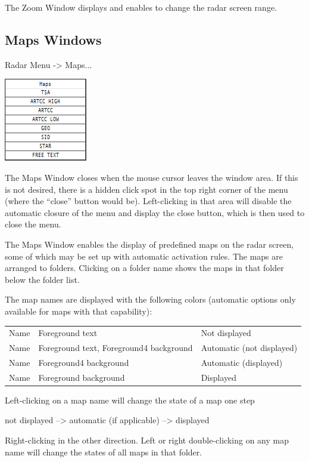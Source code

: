 \documentclass[11pt,a4paper]{memoir}
\begin{document}
The Zoom Window displays and enables to change the radar screen range.

\subsection{Maps Windows}
\label{win:mapsw}

Radar Menu -> Maps...

\includegraphics{img/mapsmenu.png}

The Maps Window closes when the mouse cursor leaves the window area. If this is not desired, there is a
hidden click spot in the top right corner of the menu (where the “close” button would be). Left-clicking in
that area will disable the automatic closure of the menu and display the close button, which is then used to
close the menu.

The Maps Window enables the display of predefined maps on the radar screen, some of which may be set
up with automatic activation rules. The maps are arranged to folders. Clicking on a folder name shows the
maps in that folder below the folder list.

The map names are displayed with the following colors (automatic options only available for maps with
that capability):

\begin{tabular}{l l l}
    Name & Foreground text                          & Not displayed\\
    Name & Foreground text, Foreground4 background  & Automatic (not displayed)\\
    Name & Foreground4 background                   & Automatic (displayed)\\
    Name & Foreground background                    & Displayed\\    
\end{tabular}

Left-clicking on a map name will change the state of a map one step

not displayed --> automatic (if applicable) --> displayed

Right-clicking in the other direction. Left or right double-clicking on any map name will change the states of all maps in that folder.
\end{document}

